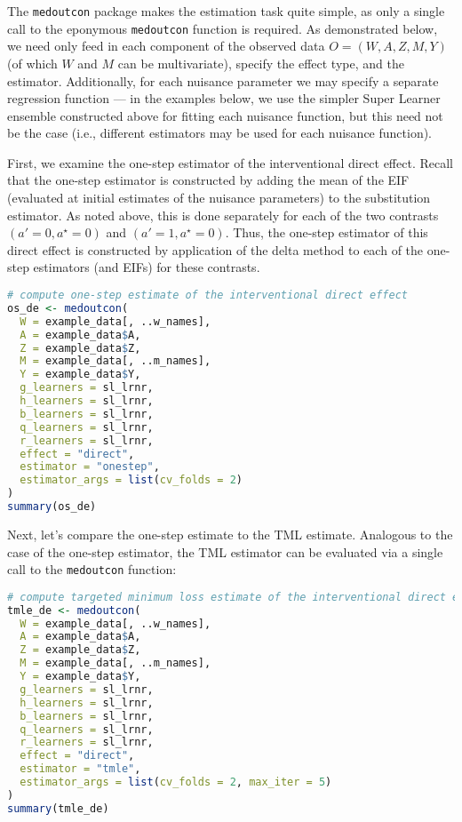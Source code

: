\documentclass[
  12pt,
]{book}
\newcommand{\passthrough}[1]{#1}
\theoremstyle{definition}
\theoremstyle{definition}
\theoremstyle{definition}
\newcommand{\1}{\mathbbm{1}}
\begin{document}
The \passthrough{\lstinline!medoutcon!} package makes the estimation task quite simple, as only a single
call to the eponymous \passthrough{\lstinline!medoutcon!} function is required. As demonstrated below,
we need only feed in each component of the observed data \(O = (W, A, Z, M, Y)\)
(of which \(W\) and \(M\) can be multivariate), specify the effect type, and the
estimator. Additionally, for each nuisance parameter we may specify a separate
regression function --- in the examples below, we use the simpler Super Learner
ensemble constructed above for fitting each nuisance function, but this need not
be the case (i.e., different estimators may be used for each nuisance function).

First, we examine the one-step estimator of the interventional direct effect.
Recall that the one-step estimator is constructed by adding the mean of the EIF
(evaluated at initial estimates of the nuisance parameters) to the substitution
estimator. As noted above, this is done separately for each of the two contrasts
\((a' = 0, a^{\star} = 0)\) and \((a' = 1, a^{\star} = 0)\). Thus, the one-step
estimator of this direct effect is constructed by application of the delta
method to each of the one-step estimators (and EIFs) for these contrasts.

\begin{lstlisting}[language=R]
# compute one-step estimate of the interventional direct effect
os_de <- medoutcon(
  W = example_data[, ..w_names],
  A = example_data$A,
  Z = example_data$Z,
  M = example_data[, ..m_names],
  Y = example_data$Y,
  g_learners = sl_lrnr,
  h_learners = sl_lrnr,
  b_learners = sl_lrnr,
  q_learners = sl_lrnr,
  r_learners = sl_lrnr,
  effect = "direct",
  estimator = "onestep",
  estimator_args = list(cv_folds = 2)
)
summary(os_de)
\end{lstlisting}

Next, let's compare the one-step estimate to the TML estimate. Analogous to the
case of the one-step estimator, the TML estimator can be evaluated via a single
call to the \passthrough{\lstinline!medoutcon!} function:

\begin{lstlisting}[language=R]
# compute targeted minimum loss estimate of the interventional direct effect
tmle_de <- medoutcon(
  W = example_data[, ..w_names],
  A = example_data$A,
  Z = example_data$Z,
  M = example_data[, ..m_names],
  Y = example_data$Y,
  g_learners = sl_lrnr,
  h_learners = sl_lrnr,
  b_learners = sl_lrnr,
  q_learners = sl_lrnr,
  r_learners = sl_lrnr,
  effect = "direct",
  estimator = "tmle",
  estimator_args = list(cv_folds = 2, max_iter = 5)
)
summary(tmle_de)
\end{lstlisting}
\end{document}
